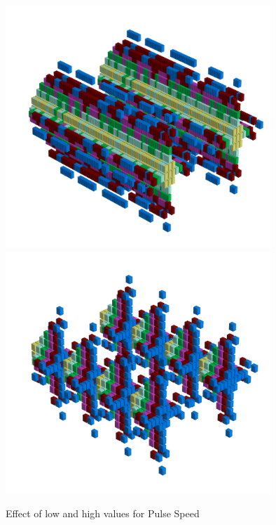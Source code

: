 \begin{figure}[H]
    \centering
    \begin{adjustbox}{width=15cm,center}
      \includegraphics[width=10cm]{src/pulsespeed/pattern0-45.png}%
      \includegraphics[width=10cm]{src/pulsespeed/pattern1-45.png}%
    \end{adjustbox}
    \caption{Effect of low and high values for Pulse Speed}
\end{figure}
